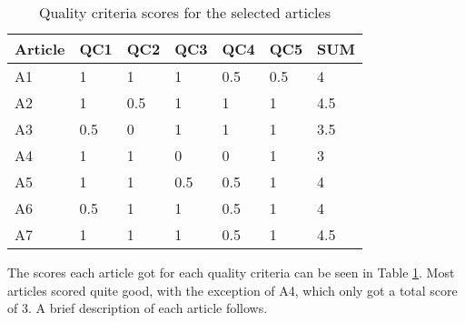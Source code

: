 \begin{table}[h]
\centering
\begin{tabular}{|l|l|l|l|l|l|l|} \hline
Article & QC1 	& QC2 	& QC3 	& QC4 	& QC5 	& SUM \\ \hline
A1 		& 1 	& 1 	& 1 	& 0.5 	& 0.5 	& 4\\ \hline
A2 		& 1 	& 0.5 	& 1 	& 1 	& 1 	& 4.5\\ \hline
A3 		& 0.5 	& 0 	& 1 	& 1 	& 1 	& 3.5\\ \hline
A4 		& 1 	& 1 	& 0 	& 0 	& 1 	& 3\\ \hline
A5 		& 1 	& 1 	& 0.5 	& 0.5 	& 1 	& 4\\ \hline
A6 		& 0.5	& 1 	& 1 	& 0.5 	& 1 	& 4\\ \hline
A7 		& 1 	& 1 	& 1 	& 0.5 	& 1 	& 4.5\\ \hline
\end{tabular}
\caption{Quality criteria scores for the selected articles}
\label{tab:qcscore}
\end{table}


The scores each article got for each quality criteria can be seen in Table \ref{tab:qcscore}. Most articles scored quite good, with the exception of A4, which only got a total score of 3. A brief description of each article follows.

